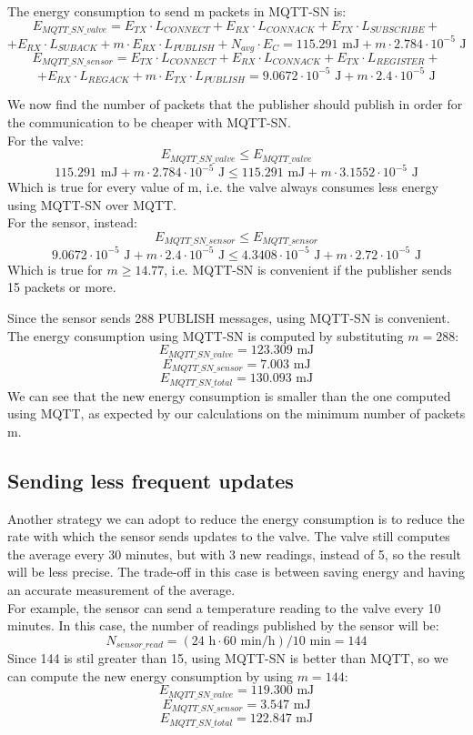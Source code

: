 The energy consumption to send m packets in MQTT-SN is:
\[E_{MQTT\_SN\_valve} = E_{TX} \cdot L_{CONNECT} + E_{RX} \cdot L_{CONNACK} + E_{TX} \cdot L_{SUBSCRIBE} +\]
\[+ E_{RX} \cdot L_{SUBACK} + m \cdot E_{RX} \cdot L_{PUBLISH} + N_{avg} \cdot E_{C} = 115.291 \text{ mJ} + m \cdot 2.784 \cdot 10^{-5} \text{ J}\]
\[E_{MQTT\_SN\_sensor} = E_{TX} \cdot L_{CONNECT} + E_{RX} \cdot L_{CONNACK} + E_{TX} \cdot L_{REGISTER} +\]
\[+ E_{RX} \cdot L_{REGACK} + m \cdot E_{TX} \cdot L_{PUBLISH} = 9.0672 \cdot 10^{-5} \text{ J} + m \cdot 2.4 \cdot 10^{-5} \text{ J}\]

We now find the number of packets that the publisher should publish in order for the communication to be cheaper with MQTT-SN.\\
For the valve:
\[E_{MQTT\_SN\_valve} \leq E_{MQTT\_valve} \]
\[115.291 \text{ mJ} + m \cdot 2.784 \cdot 10^{-5} \text{ J}  \leq 115.291 \text{ mJ} + m \cdot 3.1552 \cdot 10^{-5} \text{ J}\]
Which is true for every value of m, i.e. the valve always consumes less energy using MQTT-SN over MQTT.\\
For the sensor, instead:
\[E_{MQTT\_SN\_sensor} \leq E_{MQTT\_sensor}\]
\[9.0672 \cdot 10^{-5} \text{ J} + m \cdot 2.4 \cdot 10^{-5} \text{ J} \leq 4.3408 \cdot 10^{-5} \text{ J} + m \cdot 2.72 \cdot 10^{-5} \text{ J}\]
Which is true for $m \geq 14.77$, i.e. MQTT-SN is convenient if the publisher sends 15 packets or more.

Since the sensor sends 288 PUBLISH messages, using MQTT-SN is convenient. The energy consumption using MQTT-SN is computed by substituting $m = 288$:
\[E_{MQTT\_SN\_valve} = 123.309 \text{ mJ}\]
\[E_{MQTT\_SN\_sensor} = 7.003 \text{ mJ}\]
\[E_{MQTT\_SN\_total} = 130.093 \text{ mJ}\]
We can see that the new energy consumption is smaller than the one computed using MQTT, as expected by our calculations on the minimum number of packets m.

\subsection{Sending less frequent updates}
Another strategy we can adopt to reduce the energy consumption is to reduce the rate with which the sensor sends updates to the valve. The valve still computes the average every 30 minutes, but with 3 new readings, instead of 5, so the result will be less precise. The trade-off in this case is between saving energy and having an accurate measurement of the average.\\
For example, the sensor can send a temperature reading to the valve every 10 minutes. In this case, the number of readings published by the sensor will be:
\[N_{sensor\_read} = (24\text{ h}  \cdot 60 \text{ min/h}) / 10 \text{ min} = 144\]
Since 144 is stil greater than 15, using MQTT-SN is better than MQTT, so we can compute the new energy consumption by using $m = 144$:
\[E_{MQTT\_SN\_valve} = 119.300 \text{ mJ}\]
\[E_{MQTT\_SN\_sensor} = 3.547 \text{ mJ}\]
\[E_{MQTT\_SN\_total} = 122.847 \text{ mJ}\]


